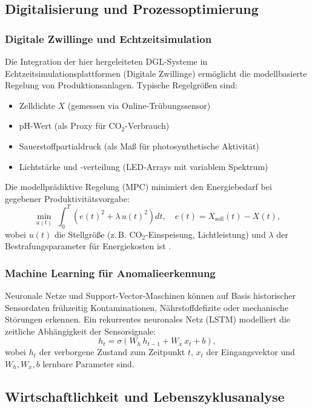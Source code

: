 ﻿\documentclass[a4paper,12pt]{article}
\theoremstyle{definition}
\begin{document}
\subsection{Digitalisierung und Prozessoptimierung}

\subsubsection{Digitale Zwillinge und Echtzeitsimulation}

Die Integration der hier hergeleiteten DGL-Systeme in Echtzeitsimulationsplattformen
(Digitale Zwillinge) ermöglicht die modellbasierte Regelung von Produktionsanlagen.
Typische Regelgrößen sind:
\begin{itemize}
	\item Zelldichte $X$ (gemessen via Online-Trübungssensor)
	\item pH-Wert (als Proxy für CO$_2$-Verbrauch)
	\item Sauerstoffpartialdruck (als Maß für photosynthetische Aktivität)
	\item Lichtstärke und -verteilung (LED-Arrays mit variablem Spektrum)
\end{itemize}
Die modellprädiktive Regelung (MPC) minimiert den Energiebedarf bei
gegebener Produktivitätsvorgabe:
\[
	\min_{u(t)}\; \int_0^T \left(e(t)^2 + \lambda\,u(t)^2\right)dt,\quad
	e(t) = X_\mathrm{soll}(t) - X(t),
\]
wobei $u(t)$ die Stellgröße (z.\,B. CO$_2$-Einspeisung, Lichtleistung) und
$\lambda$ der Bestrafungsparameter für Energiekosten ist \cite{posten2009}.

\subsubsection{Machine Learning für Anomalieerkennung}

Neuronale Netze und Support-Vector-Maschinen können auf Basis historischer
Sensordaten frühzeitig Kontaminationen, Nährstoffdefizite oder mechanische
Störungen erkennen. Ein rekurrentes neuronales Netz (LSTM) modelliert die
zeitliche Abhängigkeit der Sensorsignale:
\[
	h_t = \sigma(W_h\,h_{t-1} + W_x\,x_t + b),
\]
wobei $h_t$ der verborgene Zustand zum Zeitpunkt $t$, $x_t$ der Eingangsvektor
und $W_h, W_x, b$ lernbare Parameter sind.

\subsection{Wirtschaftlichkeit und Lebenszyklusanalyse}
\end{document}
